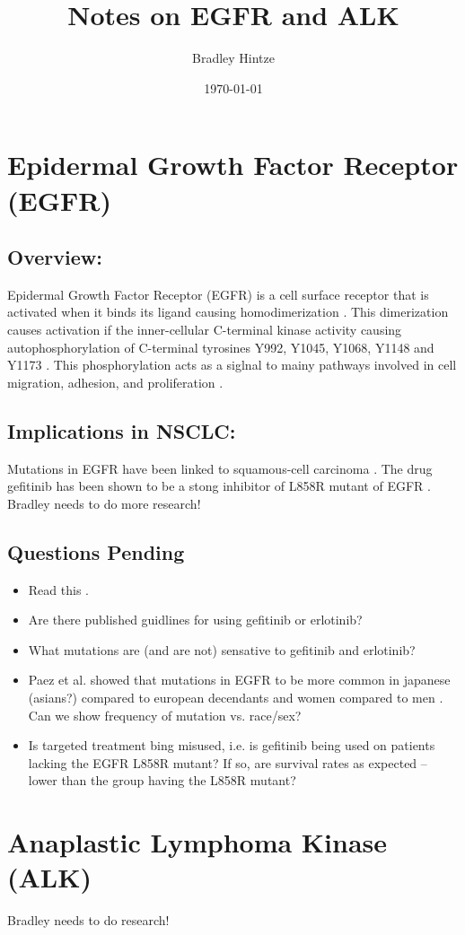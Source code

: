 \documentclass[12pt]{article}
\title{Notes on EGFR and ALK}
\author{Bradley Hintze}
\date{\today}
\begin{document}
\maketitle

\section{Epidermal Growth Factor Receptor (EGFR)}
\subsection*{Overview:}
Epidermal Growth Factor Receptor (EGFR) is a cell surface receptor that is activated when it binds its ligand causing homodimerization \cite{Yarden1987}. This dimerization causes activation if the inner-cellular C-terminal kinase activity causing autophosphorylation of C-terminal tyrosines Y992, Y1045, Y1068, Y1148 and Y1173 \cite{Downward1984}. This phosphorylation acts as a siglnal to mainy pathways involved in cell migration, adhesion, and proliferation \cite{Oda2005}.

\subsection*{Implications in NSCLC:}
Mutations in EGFR have been linked to squamous-cell carcinoma \cite{Walker2009}. The drug gefitinib has been shown to be a stong inhibitor of L858R mutant of EGFR \cite{Paez2004}. Bradley needs to do more research!

\noindent
\subsection*{Questions Pending}
\begin{itemize}
\item Read this \cite{Rosell2009}.
\item Are there published guidlines for using gefitinib or erlotinib?
\item What mutations are (and are not) sensative to gefitinib and erlotinib?
\item Paez et al. showed that mutations in EGFR to be more common in japanese (asians?) compared to european decendants and women compared to men \cite{Paez2004}. Can we show frequency of mutation vs. race/sex?
\item Is targeted treatment bing misused, i.e. is gefitinib being used on patients lacking the EGFR  L858R mutant? If so, are survival rates as expected -- lower than the group having the L858R mutant?
\end{itemize}

\section{Anaplastic Lymphoma Kinase (ALK)}
Bradley needs to do research!

\newpage

\end{document}
